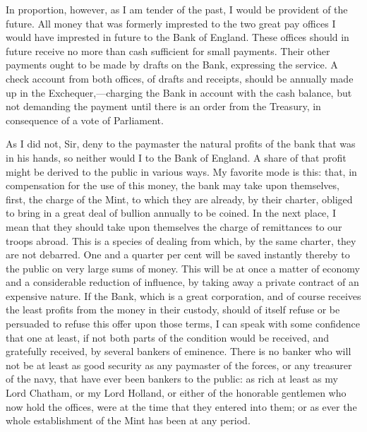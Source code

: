 In proportion, however, as I am tender of the past, I would be provident of the future. All money that was formerly imprested to the two great pay offices I would have imprested in future to the Bank of England. These offices should in future receive no more than cash sufficient for small payments. Their other payments ought to be made by drafts on the Bank, expressing the service. A check account from both offices, of drafts and receipts, should be annually made up in the Exchequer,—charging the Bank in account with the cash balance, but not demanding the payment until there is an order from the Treasury, in consequence of a vote of Parliament.

As I did not, Sir, deny to the paymaster the natural profits of the bank that was in his hands, so neither would I to the Bank of England. A share of that profit might be derived to the public in various ways. My favorite mode is this: that, in compensation for the use of this money, the bank may take upon themselves, first, the charge of the Mint, to which they are already, by their charter, obliged to bring in a great deal of bullion annually to be coined. In the next place, I mean that they should take upon themselves the charge of remittances to our troops abroad. This is a species of dealing from which, by the same charter, they are not debarred. One and a quarter per cent will be saved instantly thereby to the public on very large sums of money. This will be at once a matter of economy and a considerable reduction of influence, by taking away a private contract of an expensive nature. If the Bank, which is a great corporation, and of course receives the least profits from the money in their custody, should of itself refuse or be persuaded to refuse this offer upon those terms, I can speak with some confidence that one at least, if not both parts of the condition would be received, and gratefully received, by several bankers of eminence. There is no banker who will not be at least as good security as any paymaster of the forces, or any treasurer of the navy, that have ever been bankers to the public: as rich at least as my Lord Chatham, or my Lord Holland, or either of the honorable gentlemen who now hold the offices, were at the time that they entered into them; or as ever the whole establishment of the Mint has been at any period.

